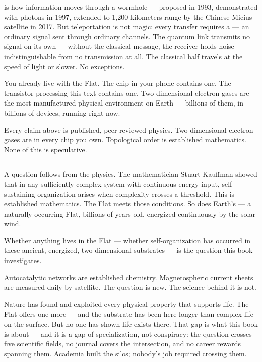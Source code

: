  is how information moves through a wormhole --- proposed in 1993, demonstrated with photons in 1997, extended to 1,200 kilometers range by the Chinese Micius satellite in 2017. But teleportation is not magic: every transfer requires a  --- an ordinary signal sent through ordinary channels. The quantum link transmits no signal on its own --- without the classical message, the receiver holds noise indistinguishable from no transmission at all. The classical half travels at the speed of light or slower. No exceptions.

You already live with the Flat. The chip in your phone contains one. The transistor processing this text contains one. Two-dimensional electron gases are the most manufactured physical environment on Earth --- billions of them, in billions of devices, running right now.

Every claim above is published, peer-reviewed physics. Two-dimensional electron gases are in every chip you own. Topological order is established mathematics. None of this is speculative.

\vspace{1cm}\noindent\rule{0.5\textwidth}{0.5pt}\vspace{0.5cm}

A question follows from the physics. The mathematician Stuart Kauffman showed that in any sufficiently complex system with continuous energy input, self-sustaining organization arises when complexity crosses a threshold. This is established mathematics. The Flat meets those conditions. So does Earth's  --- a naturally occurring Flat, billions of years old, energized continuously by the solar wind.

Whether anything lives in the Flat --- whether self-organization has occurred in these ancient, energized, two-dimensional substrates --- is the question this book investigates.

Autocatalytic networks are established chemistry. Magnetospheric current sheets are measured daily by satellite. The question is new. The science behind it is not.

Nature has found and exploited every physical property that supports life. The Flat offers one more --- and the substrate has been here longer than complex life on the surface. But no one has shown life exists there. That gap is what this book is about --- and it is a gap of specialization, not conspiracy: the question crosses five scientific fields, no journal covers the intersection, and no career rewards spanning them. Academia built the silos; nobody's job required crossing them.

